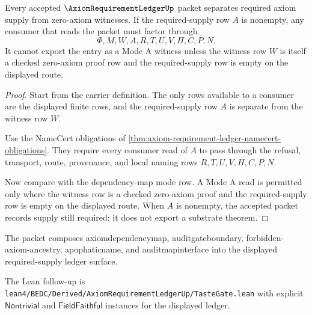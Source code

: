 \begin{theorem}
\label{thm:axiom-requirement-ledger-nonescape}
Every accepted $\AxiomRequirementLedgerUp$ packet separates required axiom supply from zero-axiom witnesses. If the required-supply row $A$ is nonempty, any consumer that reads the packet must factor through
$$
\Phi,M,W,A,R,T,U,V,H,C,P,N.
$$
It cannot export the entry as a Mode A witness unless the witness row $W$ is itself a checked zero-axiom proof row and the required-supply row is empty on the displayed route.
\end{theorem}
\begin{proof}
Start from the carrier definition. The only rows available to a consumer are the displayed finite rows, and the required-supply row $A$ is separate from the witness row $W$.

Use the NameCert obligations of \autoref{thm:axiom-requirement-ledger-namecert-obligations}. They require every consumer read of $A$ to pass through the refusal, transport, route, provenance, and local naming rows $R,T,U,V,H,C,P,N$.

Now compare with the dependency-map mode row. A Mode A read is permitted only where the witness row is a checked zero-axiom proof and the required-supply row is empty on the displayed route. When $A$ is nonempty, the accepted packet records supply still required; it does not export a substrate theorem.
\end{proof}



The packet composes axiomdependencymap, auditgateboundary, forbidden-axiom-ancestry, apophaticname, and auditmapinterface into the displayed required-supply ledger surface.

The Lean follow-up is \texttt{lean4/BEDC/Derived/AxiomRequirementLedgerUp/TasteGate.lean} with explicit $\mathsf{Nontrivial}$ and $\mathsf{FieldFaithful}$ instances for the displayed ledger.

